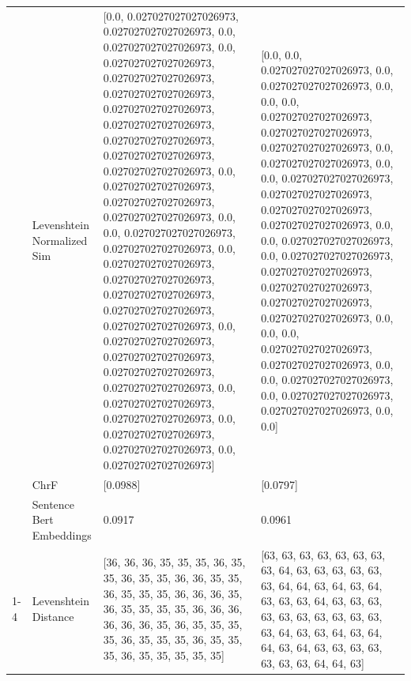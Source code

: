 \begin{tabular}{llll}
 & Levenshtein Normalized Sim & [0.0, 0.027027027027026973, 0.027027027027026973, 0.0, 0.027027027027026973, 0.0, 0.027027027027026973, 0.027027027027026973, 0.027027027027026973, 0.027027027027026973, 0.027027027027026973, 0.027027027027026973, 0.027027027027026973, 0.027027027027026973, 0.0, 0.027027027027026973, 0.027027027027026973, 0.027027027027026973, 0.0, 0.0, 0.027027027027026973, 0.027027027027026973, 0.0, 0.027027027027026973, 0.027027027027026973, 0.027027027027026973, 0.027027027027026973, 0.027027027027026973, 0.0, 0.027027027027026973, 0.027027027027026973, 0.027027027027026973, 0.027027027027026973, 0.0, 0.027027027027026973, 0.027027027027026973, 0.0, 0.027027027027026973, 0.027027027027026973, 0.0, 0.027027027027026973] & [0.0, 0.0, 0.027027027027026973, 0.0, 0.027027027027026973, 0.0, 0.0, 0.0, 0.027027027027026973, 0.027027027027026973, 0.027027027027026973, 0.0, 0.027027027027026973, 0.0, 0.0, 0.027027027027026973, 0.027027027027026973, 0.027027027027026973, 0.027027027027026973, 0.0, 0.0, 0.027027027027026973, 0.0, 0.027027027027026973, 0.027027027027026973, 0.027027027027026973, 0.027027027027026973, 0.027027027027026973, 0.0, 0.0, 0.0, 0.027027027027026973, 0.027027027027026973, 0.0, 0.0, 0.027027027027026973, 0.0, 0.027027027027026973, 0.027027027027026973, 0.0, 0.0] \\
 & ChrF & [0.0988] & [0.0797] \\
 & Sentence Bert Embeddings & 0.0917 & 0.0961 \\
\cline{1-4}
\multirow[t]{4}{*}{Akwaagala, Akwaagula no bujama bwo.} & Levenshtein Distance & [36, 36, 36, 35, 35, 35, 36, 35, 35, 36, 35, 35, 36, 36, 35, 35, 36, 35, 35, 35, 36, 36, 36, 35, 36, 35, 35, 35, 35, 36, 36, 36, 36, 36, 36, 35, 36, 35, 35, 35, 35, 36, 35, 35, 35, 36, 35, 35, 35, 36, 35, 35, 35, 35, 35] & [63, 63, 63, 63, 63, 63, 63, 63, 64, 63, 63, 63, 63, 63, 63, 64, 64, 63, 64, 63, 64, 63, 63, 63, 64, 63, 63, 63, 63, 63, 63, 63, 63, 63, 63, 63, 64, 63, 63, 64, 63, 64, 64, 63, 64, 63, 63, 63, 63, 63, 63, 63, 64, 64, 63] \\

\end{tabular}
